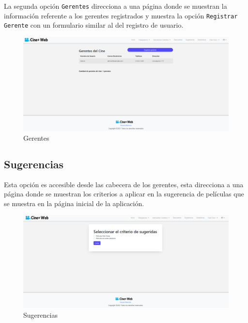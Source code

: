 La segunda opci\'on \verb*|Gerentes| direcciona a una p\'agina donde se muestran la informaci\'on referente a los gerentes registrados y muestra la opci\'on \verb*|Registrar|  \verb*|Gerente| con un formulario similar al del registro de usuario.
\newpage
\begin{figure}[h!]
	\centering
	\includegraphics[scale=0.35]{./chapters/img/ver_gerentes.png}
	
	\label{fig:ver_gerentes}
	\caption{Gerentes}
	
\end{figure}

\subsection{Sugerencias}
Esta opci\'on es accesible desde las cabecera de los gerentes, esta direcciona a una p\'agina donde se muestran los criterios a aplicar en la sugerencia de pel\'iculas que se muestra en la p\'agina inicial de la aplicaci\'on.

\begin{figure}[h!]
	\centering
	\includegraphics[scale=0.35]{./chapters/img/criteria.png}
	
	\label{fig:criteria}
	\caption{Sugerencias}
	
\end{figure}

